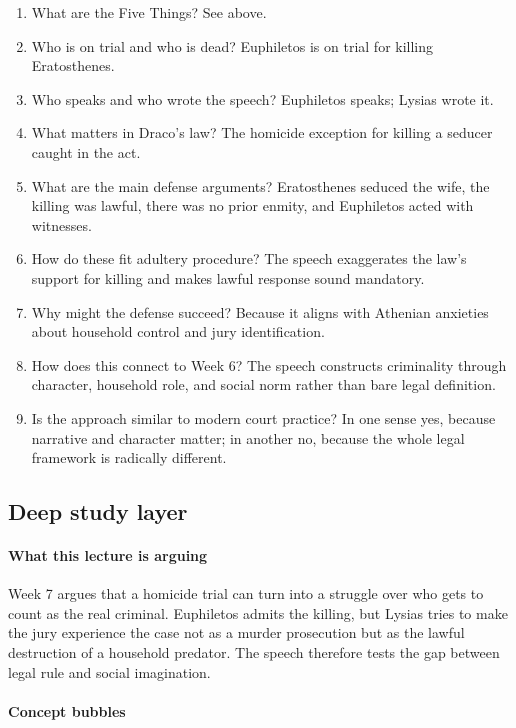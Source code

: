 \documentclass[11pt]{article}
\begin{document}
\begin{enumerate}
\item What are the Five Things? See above.
\item Who is on trial and who is dead? Euphiletos is on trial for killing Eratosthenes.
\item Who speaks and who wrote the speech? Euphiletos speaks; Lysias wrote it.
\item What matters in Draco's law? The homicide exception for killing a seducer caught in the act.
\item What are the main defense arguments? Eratosthenes seduced the wife, the killing was lawful, there was no prior enmity, and Euphiletos acted with witnesses.
\item How do these fit adultery procedure? The speech exaggerates the law's support for killing and makes lawful response sound mandatory.
\item Why might the defense succeed? Because it aligns with Athenian anxieties about household control and jury identification.
\item How does this connect to Week 6? The speech constructs criminality through character, household role, and social norm rather than bare legal definition.
\item Is the approach similar to modern court practice? In one sense yes, because narrative and character matter; in another no, because the whole legal framework is radically different.
\end{enumerate}

\subsection{Deep study layer}

\paragraph{What this lecture is arguing}

Week 7 argues that a homicide trial can turn into a struggle over who gets to count as the real criminal. Euphiletos admits the killing, but Lysias tries to make the jury experience the case not as a murder prosecution but as the lawful destruction of a household predator. The speech therefore tests the gap between legal rule and social imagination.

\paragraph{Concept bubbles}
\end{document}
